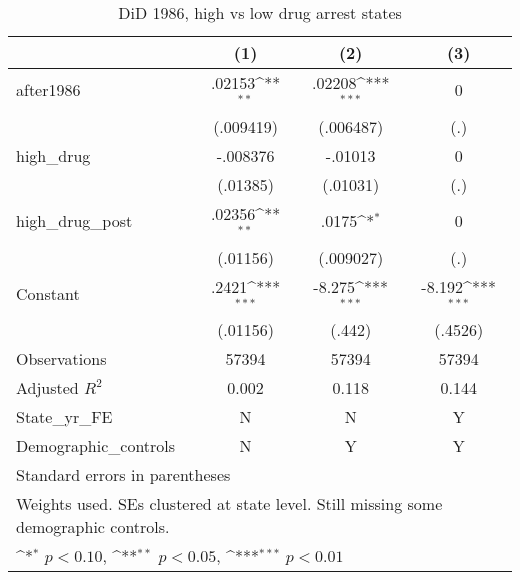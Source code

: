 \begin{table}[htbp]\centering
\def\sym#1{\ifmmode^{#1}\else\(^{#1}\)\fi}
\caption{DiD 1986, high vs low drug arrest states}
\begin{tabular}{l*{3}{c}}
\hline\hline
                    &\multicolumn{1}{c}{(1)}         &\multicolumn{1}{c}{(2)}         &\multicolumn{1}{c}{(3)}         \\
\hline
after1986           &      .02153\sym{**} &      .02208\sym{***}&           0         \\
                    &   (.009419)         &   (.006487)         &         (.)         \\
[1em]
high\_drug           &    -.008376         &     -.01013         &           0         \\
                    &    (.01385)         &    (.01031)         &         (.)         \\
[1em]
high\_drug\_post      &      .02356\sym{**} &       .0175\sym{*}  &           0         \\
                    &    (.01156)         &   (.009027)         &         (.)         \\
[1em]
Constant            &       .2421\sym{***}&      -8.275\sym{***}&      -8.192\sym{***}\\
                    &    (.01156)         &      (.442)         &     (.4526)         \\
\hline
Observations        &       57394         &       57394         &       57394         \\
Adjusted \(R^{2}\)  &       0.002         &       0.118         &       0.144         \\
State\_yr\_FE         &           N         &           N         &           Y         \\
Demographic\_controls&           N         &           Y         &           Y         \\
\hline\hline
\multicolumn{4}{l}{\footnotesize Standard errors in parentheses}\\
\multicolumn{4}{l}{\footnotesize Weights used. SEs clustered at state level. Still missing some demographic controls.}\\
\multicolumn{4}{l}{\footnotesize \sym{*} \(p<0.10\), \sym{**} \(p<0.05\), \sym{***} \(p<0.01\)}\\
\end{tabular}
\end{table}
